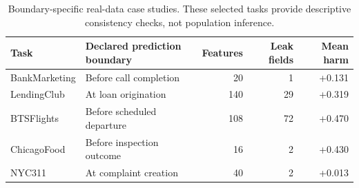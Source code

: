 \begin{table}[t]
\caption{Boundary-specific real-data case studies. These selected tasks provide descriptive consistency checks, not population inference.}
\label{tab:natural}
\centering\small
\begin{tabular}{llrrr}
\toprule
Task & Declared prediction boundary & Features & Leak fields & Mean harm \\
\midrule
BankMarketing & Before call completion & 20 & 1 & +0.131 \\
LendingClub & At loan origination & 140 & 29 & +0.319 \\
BTSFlights & Before scheduled departure & 108 & 72 & +0.470 \\
ChicagoFood & Before inspection outcome & 16 & 2 & +0.430 \\
NYC311 & At complaint creation & 40 & 2 & +0.013 \\
\bottomrule
\end{tabular}
\end{table}
